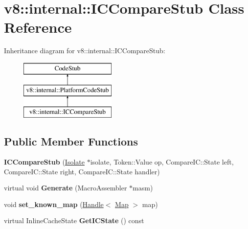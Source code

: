 \hypertarget{classv8_1_1internal_1_1_i_c_compare_stub}{}\section{v8\+:\+:internal\+:\+:I\+C\+Compare\+Stub Class Reference}
\label{classv8_1_1internal_1_1_i_c_compare_stub}
Inheritance diagram for v8\+:\+:internal\+:\+:I\+C\+Compare\+Stub\+:\begin{figure}[H]
\begin{center}
\leavevmode
\includegraphics[height=3.000000cm]{classv8_1_1internal_1_1_i_c_compare_stub}
\end{center}
\end{figure}
\subsection*{Public Member Functions}
\begin{DoxyCompactItemize}
\item 
\hypertarget{classv8_1_1internal_1_1_i_c_compare_stub_afb05daaf4b65fa6e61ac86fba22ed923}{}{\bfseries I\+C\+Compare\+Stub} (\hyperlink{classv8_1_1internal_1_1_isolate}{Isolate} $\ast$isolate, Token\+::\+Value op, Compare\+I\+C\+::\+State left, Compare\+I\+C\+::\+State right, Compare\+I\+C\+::\+State handler)\label{classv8_1_1internal_1_1_i_c_compare_stub_afb05daaf4b65fa6e61ac86fba22ed923}

\item 
\hypertarget{classv8_1_1internal_1_1_i_c_compare_stub_a6b23110a295f7e87c8bf96619c0b30d1}{}virtual void {\bfseries Generate} (Macro\+Assembler $\ast$masm)\label{classv8_1_1internal_1_1_i_c_compare_stub_a6b23110a295f7e87c8bf96619c0b30d1}

\item 
\hypertarget{classv8_1_1internal_1_1_i_c_compare_stub_abe3a99459cd0ba2d1f84931eca32dec2}{}void {\bfseries set\+\_\+known\+\_\+map} (\hyperlink{classv8_1_1internal_1_1_handle}{Handle}$<$ \hyperlink{classv8_1_1internal_1_1_map}{Map} $>$ map)\label{classv8_1_1internal_1_1_i_c_compare_stub_abe3a99459cd0ba2d1f84931eca32dec2}

\item 
\hypertarget{classv8_1_1internal_1_1_i_c_compare_stub_a99f6bdf1d90e08d45825e9276896f36d}{}virtual Inline\+Cache\+State {\bfseries Get\+I\+C\+State} () const \label{classv8_1_1internal_1_1_i_c_compare_stub_a99f6bdf1d90e08d45825e9276896f36d}

\end{DoxyCompactItemize}
